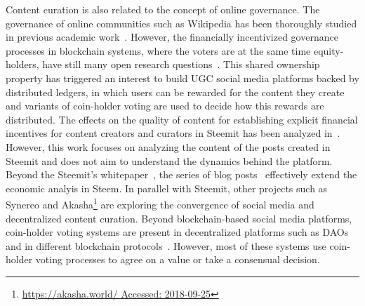 Content curation is also related to the concept of online governance. The governance of online communities such as Wikipedia has been thoroughly studied in previous academic work~\cite{leskovec2010governance,forte2008scaling}. However, the financially incentivized governance processes in blockchain systems, where the voters are at the same time equity-holders, have still many open research questions~\cite{vitalik,ehrsam}. This shared ownership property has triggered an interest to build UGC social media platforms backed by distributed ledgers, in which users can be rewarded for the content they create and variants of coin-holder voting are used to decide how this rewards are distributed.
The effects on the quality of content for establishing explicit financial incentives for content creators and curators in Steemit has been analyzed in~\cite{thelwall2017can}.
However, this work focuses on analyzing the content of the posts created in Steemit and does not aim to understand the dynamics behind the platform. Beyond the Steemit's whitepaper~\cite{steemit}, the series of blog posts~\cite{curationRewards,selfvoters} effectively extend the economic analyis in Steem. In parallel with Steemit, other projects such as Synereo\cite{synereo} and Akasha\footnote{\url{https://akasha.world/ Accessed: 2018-09-25}} are exploring the convergence of social media and decentralized content curation.
Beyond blockchain-based social media platforms, coin-holder voting systems are present in decentralized platforms such as DAOs~\cite{darkdaos} and in different blockchain protocols~\cite{dash,tezos}. However, most of these systems use coin-holder voting processes to agree on a value or take a consensual decision.
